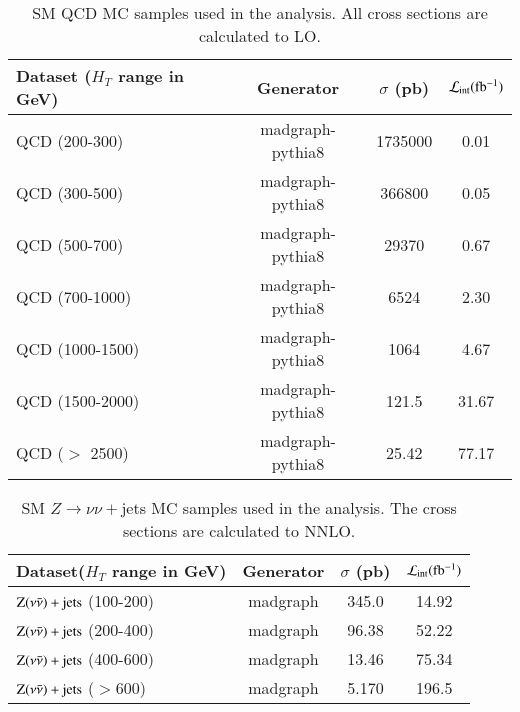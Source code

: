 \begin{table}[h]
\centering
\caption{SM QCD MC samples used in the analysis. All cross
  sections are calculated to LO.}
\label{tab:qcdMCsamples}
{\footnotesize
\begin{tabular}{lccc}
\hline \hline
Dataset ($H_{T}$ range in GeV) &Generator & $\sigma$ (pb) & ${\cal L}_{\rm int}(\rm fb^{-1}) $\\
\hline
QCD (200-300) & madgraph-pythia8 & 1735000 & 0.01\\
QCD (300-500) & madgraph-pythia8 & 366800 & 0.05\\
QCD (500-700) & madgraph-pythia8 & 29370 & 0.67\\
QCD (700-1000) & madgraph-pythia8 & 6524 & 2.30\\
QCD (1000-1500) & madgraph-pythia8 & 1064 & 4.67\\
QCD (1500-2000) & madgraph-pythia8 & 121.5 & 31.67\\
QCD ($>$ 2500) & madgraph-pythia8 & 25.42 & 77.17\\
\hline \hline
\end{tabular}
}
\end{table}


\begin{table}[h]
\centering
\caption{SM $Z\rightarrow\nu\nu+$jets MC samples used in the analysis. The cross
  sections are calculated to NNLO. }
\label{tab:zjetsMCsamples}
{\footnotesize
\begin{tabular}{lccc}
\hline \hline
Dataset($H_{T}$ range in GeV) & Generator & $\sigma$ (pb) & ${\cal L}_{\rm int}(\rm fb^{-1})$ \\
\hline
$\rm Z(\nu \bar{\nu})+{\rm jets}$  (100-200) & madgraph & 345.0 & 14.92\\
$\rm Z(\nu \bar{\nu})+{\rm jets}$  (200-400) & madgraph & 96.38 & 52.22\\
$\rm Z(\nu \bar{\nu})+{\rm jets}$  (400-600) & madgraph & 13.46 & 75.34\\
$\rm Z(\nu \bar{\nu})+{\rm jets}$  ($ > $600) & madgraph & 5.170 & 196.5\\
\hline \hline
\end{tabular}
}
\end{table}

